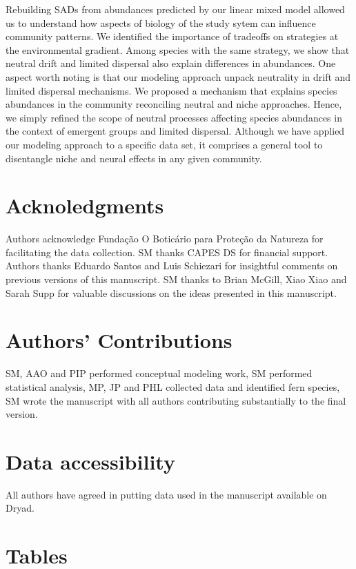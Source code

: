 \documentclass[12pt]{article}
\begin{document}
Rebuilding SADs from abundances predicted by our linear mixed model  
allowed us to understand how aspects of biology of the study sytem can influence community
patterns. We 
identified the importance of tradeoffs on strategies at the environmental gradient. Among species with the
same strategy, we show that
neutral drift and limited dispersal also explain differences in
abundances.  
One aspect worth noting is
that our modeling approach unpack neutrality in drift and limited
dispersal mechanisms. 
We proposed a mechanism that explains species
abundances in the community reconciling neutral and niche
approaches. Hence, we simply refined the scope of neutral processes
affecting species abundances in the context of emergent groups and
limited dispersal. Although we have applied our modeling approach to a specific data set, it comprises a general tool to disentangle niche and neural effects in any given community. 

\fi

\section*{Acknoledgments} 
Authors acknowledge Fundação O Boticário para Proteção da Natureza for facilitating the data collection. SM thanks CAPES DS for financial support. Authors thanks Eduardo Santos and Luis Schiezari for insightful comments on previous versions of this manuscript. SM thanks to Brian McGill, Xiao Xiao and Sarah Supp for valuable discussions on the ideas presented in this manuscript.

\section*{Authors' Contributions} 
SM, AAO and PIP performed conceptual modeling work, SM performed statistical analysis, MP, JP and PHL collected data and identified fern species, SM wrote the manuscript with all authors contributing substantially to the final version.

\section*{Data accessibility} 
All authors have agreed in putting data used in the manuscript available on Dryad.




\newpage 


\section*{Tables}
\end{document}
